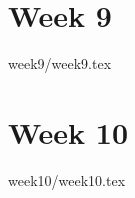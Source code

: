 \documentclass[a4paper]{book}
\begin{document}
\chapter{Week 9}

{week9/week9.tex}

\chapter{Week 10}

{week10/week10.tex}










\end{document}

